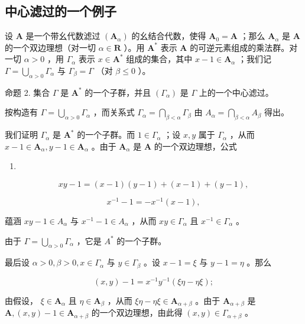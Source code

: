 \subsection{中心滤过的一个例子}

设 \(\mathbf{A}\) 是一个带幺代数滤过 \((\mathbf{A}_{\alpha})\) 的幺结合代数，使得 \(\mathbf{A}_{0} = \mathbf{A}\) ；那么 \(\mathbf{A}_{\alpha}\) 是 \(\mathbf{A}\) 的一个双边理想（对一切 \(\alpha \in \mathbf{R}\) ）。用 \(\mathbf{A}^*\) 表示 \(\mathbf{A}\) 的可逆元素组成的乘法群。对一切 \(\alpha > 0\) ，用 \(\Gamma_{\alpha}\) 表示 \(x \in \mathbf{A}^*\) 组成的集合，其中 \(x - 1 \in \mathbf{A}_{\alpha}\) ；我们记 \(\Gamma = \bigcup_{\alpha > 0} \Gamma_{\alpha}\) 与 \(\Gamma_{\beta} = \Gamma\) （对 \(\beta \leqslant 0\) ）。

命题 2. 集合 \(\Gamma\) 是 \(\mathbf{A}^*\) 的一个子群，并且 \((\Gamma_{\alpha})\) 是 \(\Gamma\) 上的一个中心滤过。

按构造有 \(\Gamma = \bigcup_{\alpha > 0} \Gamma_{\alpha}\) ，而关系式 \(\Gamma_{\alpha} = \bigcap_{\beta < \alpha} \Gamma_{\beta}\) 由 \(A_{\alpha} = \bigcap_{\beta < \alpha} A_{\beta}\) 得出。

我们证明 \(\Gamma_{\alpha}\) 是 \(\mathbf{A}^*\) 的一个子群。而 \(1 \in \Gamma_{\alpha}\) ；设 \(x, y\) 属于 \(\Gamma_{\alpha}\) ，从而 \(x - 1 \in \mathbf{A}_{\alpha}, y - 1 \in \mathbf{A}_{\alpha}\) 。由于 \(\mathbf{A}_{\alpha}\) 是 \(\mathbf{A}\) 的一个双边理想，公式

\begin{enumerate}
\def\labelenumi{(\arabic{enumi})}
\setcounter{enumi}{20}
\tightlist
\item
\end{enumerate}

\[
x y - 1 = (x - 1) (y - 1) + (x - 1) + (y - 1),\tag{21}
\]

\[
x ^ {- 1} - 1 = - x ^ {- 1} (x - 1),\tag{22}
\]

蕴涵 \(xy - 1 \in A_{\alpha}\) 与 \(x^{-1} - 1 \in A_{\alpha}\) ，从而 \(xy \in \Gamma_{\alpha}\) 且 \(x^{-1} \in \Gamma_{\alpha}\) 。

由于 \(\Gamma = \bigcup_{\alpha > 0} \Gamma_{\alpha}\) ，它是 \(A^{*}\) 的一个子群。

最后设 \(\alpha > 0, \beta > 0, x \in \Gamma_{\alpha}\) 与 \(y \in \Gamma_{\beta}\) 。设 \(x - 1 = \xi\) 与 \(y - 1 = \eta\) 。那么

\[
(x, y) - 1 = x ^ {- 1} y ^ {- 1} (\xi \eta - \eta \xi);\tag{23}
\]

由假设， \(\xi \in \mathbf{A}_{\alpha}\) 且 \(\eta \in \mathbf{A}_{\beta}\) ，从而 \(\xi \eta - \eta \xi \in \mathbf{A}_{\alpha + \beta}\) 。由于 \(\mathbf{A}_{\alpha + \beta}\) 是 \(\mathbf{A}, (x, y) - 1 \in \mathbf{A}_{\alpha + \beta}\) 的一个双边理想，由此得 \((x, y) \in \Gamma_{\alpha + \beta}\) 。

